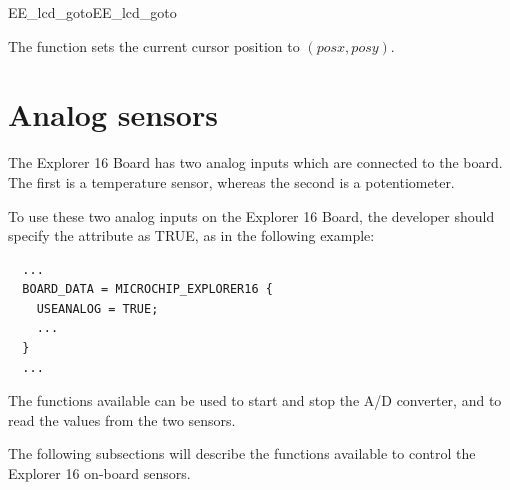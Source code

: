 \begin{function_nopb2}{EE\_lcd\_goto}{EE_lcd_goto}
  
  \begin{fundescription}
    The function sets the current cursor position to $(posx, posy)$.
  \end{fundescription}
  
  \begin{funparameters}
  \end{funparameters}
  
  
\end{function_nopb2}



\section{Analog sensors}

The Explorer 16 Board has two analog inputs which are connected to the
board. The first is a temperature sensor, whereas the second is a
potentiometer.

To use these two analog inputs on the Explorer 16 Board, the developer
should specify the  attribute as TRUE, as in the
following example:

\begin{lstlisting}
  ...
  BOARD_DATA = MICROCHIP_EXPLORER16 {
    USEANALOG = TRUE;
    ...
  }
  ...
\end{lstlisting}

The functions available can be used to start and stop the A/D
converter, and to read the values from the two sensors.

The following subsections will describe the functions available to
control the Explorer 16 on-board sensors.


